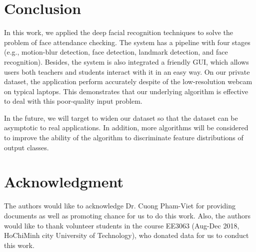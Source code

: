 \documentclass[journal, twocolumn]{IEEEtran}
\begin{document}
\section{Conclusion}
\label{conclusion}

In this work, we applied the deep facial recognition techniques to solve the problem of face attendance checking. The system has a pipeline with four stages (e.g., motion-blur detection, face detection, landmark detection, and face recognition). Besides, the system is also integrated a friendly GUI, which allows users both teachers and students interact with it in an easy way. On our private dataset, the application perform accurately despite of the low-resolution webcam on typical laptops. This demonstrates that our underlying algorithm is effective to deal with this poor-quality input problem.

In the future, we will target to widen our dataset so that the dataset can be asymptotic to real applications. In addition, more algorithms will be considered to improve the ability of the algorithm to discriminate feature distributions of output classes.


\section*{Acknowledgment}

The authors would like to acknowledge Dr. Cuong Pham-Viet for providing documents as well as promoting chance for us to do this work. Also, the authors would like to thank volunteer students in the course EE3063 (Aug-Dec 2018, HoChiMinh city University of Technology), who donated data for us to conduct this work.


\begin{thebibliography}{9}

\end{thebibliography}
\end{document}
